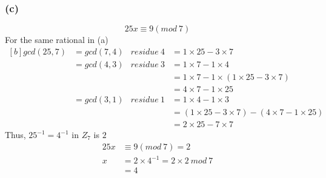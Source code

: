 \documentclass[11pt]{article}
\begin{document}
\subsubsection*{(c)}
$$25x\equiv 9(mod\ 7)$$
For the same rational in (a)\\
\begin{equation}
\begin{aligned}[b]
gcd(25,7)	&=gcd(7,4)	&residue\ 4	&= 1\times 25-3\times 7\\
			&=gcd(4,3)	&residue\ 3 &= 1\times 7-1\times 4\\
			&			&			&= 1\times 7-1\times (1\times 25-3\times 7)\\
			&			&			&= 4\times 7-1\times 25\\
			&=gcd(3,1)  &residue\ 1 &= 1\times 4-1\times 3\\
			&			&			&= (1\times 25-3\times 7)-(4\times 7 - 1\times 25)\\
			&			&			&= 2\times 25-7\times 7
\end{aligned}
\end{equation}
Thus, $25^{-1}=4^{-1}$ in $Z_{7}$ is $2$
\begin{equation}
\begin{split}
25x&\equiv 9(mod\ 7) = 2\\
x&=2\times 4^{-1}=2\times 2\ mod\ 7\\
&=4
\end{split}
\end{equation}
\end{document}
